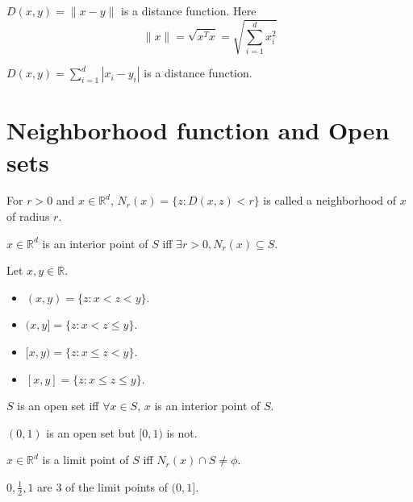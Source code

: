 \begin{theorem}$D(x, y) = \|x - y\|$ is a distance function. Here
\[ \|x\| = \sqrt{x^Tx} = \sqrt{\sum_{i=1}^d x_i^2} \]
\end{theorem}
\begin{theorem}$D(x, y) = \sum_{i=1}^d |x_i - y_i|$ is a distance function.\end{theorem}

\section{Neighborhood function and Open sets}

\begin{definition} For $r > 0$ and $x \in \mathbb{R}^d$, $N_r(x) = \{z: D(x, z) < r\}$
is called a neighborhood of $x$ of radius $r$. \end{definition}

\begin{definition} $x \in \mathbb{R}^d$ is an interior point of $S$ iff
$\exists r > 0, N_r(x) \subseteq S$. \end{definition}

\begin{definition}Let $x, y \in \mathbb{R}$.\begin{itemize}
\item $(x, y) = \{z: x < z < y\}$.
\item $(x, y] = \{z: x < z \le y\}$.
\item $[x, y) = \{z: x \le z < y\}$.
\item $[x, y] = \{z: x \le z \le y\}$.
\end{itemize}\end{definition}

\begin{definition} $S$ is an open set iff $\forall x \in S$,
$x$ is an interior point of $S$. \end{definition}

\begin{example} $(0, 1)$ is an open set but $[0, 1)$ is not. \end{example}

\begin{definition} $x \in \mathbb{R}^d$ is a limit point of $S$ iff
$N_r(x) \cap S \neq \phi$. \end{definition}

\begin{example} $0, \frac{1}{2}, 1$ are 3 of the limit points of $(0, 1]$. \end{example}

